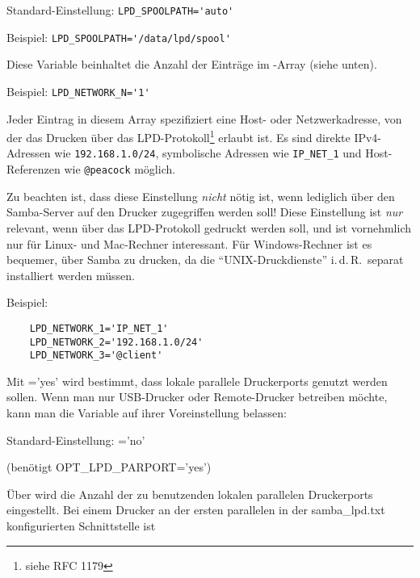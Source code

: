 \begin{description}
    Standard-Einstellung: \verb+LPD_SPOOLPATH='auto'+

    Beispiel: \verb+LPD_SPOOLPATH='/data/lpd/spool'+


    Diese Variable beinhaltet die Anzahl der Einträge im
    -Array (siehe unten).

    Beispiel: \verb+LPD_NETWORK_N='1'+


    Jeder Eintrag in diesem Array spezifiziert eine Host- oder Netzwerkadresse,
    von der das Drucken über das LPD-Protokoll\footnote{siehe RFC 1179} erlaubt
    ist. Es sind direkte IPv4-Adressen wie \verb+192.168.1.0/24+, symbolische
    Adressen wie \verb+IP_NET_1+ und Host-Referenzen wie \verb+@peacock+
    möglich.

    Zu beachten ist, dass diese Einstellung \emph{nicht} nötig ist, wenn
    lediglich über den Samba-Server auf den Drucker zugegriffen werden soll!
    Diese Einstellung ist \emph{nur} relevant, wenn über das LPD-Protokoll
    gedruckt werden soll, und ist vornehmlich nur für Linux- und Mac-Rechner
    interessant. Für Windows-Rechner ist es bequemer, über Samba zu drucken,
    da die ``UNIX-Druckdienste'' i.\,d.\,R.\ separat installiert werden
    müssen.

    Beispiel:
\begin{example}
\begin{verbatim}
    LPD_NETWORK_1='IP_NET_1'
    LPD_NETWORK_2='192.168.1.0/24'
    LPD_NETWORK_3='@client'
\end{verbatim}
\end{example}


    Mit ='yes' wird bestimmt, dass lokale parallele
    Druckerports genutzt werden sollen. Wenn man nur USB-Drucker oder Remote-Drucker
    betreiben möchte, kann man die Variable auf ihrer Voreinstellung belassen:

    Standard-Einstellung: ='no'


 (benötigt OPT\_LPD\_PARPORT='yes')

    Über  wird die Anzahl der zu benutzenden lokalen
    parallelen Druckerports eingestellt. Bei einem Drucker an der ersten
    parallelen in der samba\_lpd.txt konfigurierten Schnittstelle ist


\end{description}
